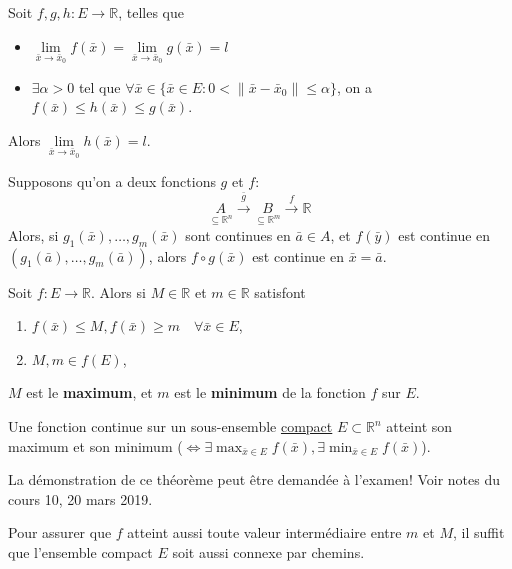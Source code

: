 \documentclass{report}
\newcommand*{\norm}[1]{\lVert#1\rVert}
\begin{document}
\begin{thm}
	Soit $f, g, h : E \to \mathbb R$, telles que
	\begin{itemize}
		\item $\lim\limits_{\bar x \to \bar x_0} f(\bar x) = \lim\limits_{\bar x \to \bar x_0} g(\bar x) = l$
		\item $\exists \alpha > 0$ tel que $\forall \bar x \in \{\bar x \in E : 0 < \norm{\bar x - \bar x_0} \leq \alpha\}$, on a $f(\bar x) \leq h(\bar x) \leq g(\bar x)$.
	\end{itemize}
	Alors $\lim\limits_{\bar x \to \bar x_0} h(\bar x) = l$.
\end{thm}

\begin{thm} Supposons qu'on a deux fonctions $g$ et $f$:
	\begin{equation*}
		\underset{\subseteq \mathbb R^n}{A} \overset{\bar g}{\longrightarrow} \underset{\subseteq \mathbb R^m}{B} \overset{f}{\longrightarrow} \mathbb R
	\end{equation*}
	Alors, si $g_1(\bar x), \ldots, g_m(\bar x)$ sont continues en $\bar a \in A$, et $f(\bar y)$ est continue en $(g_1(\bar a), \ldots, g_m(\bar a))$, alors $f \circ g(\bar x)$ est continue en $\bar x = \bar a$.
\end{thm}

\begin{defn}
	Soit $f : E \to \mathbb R$. Alors si $M \in \mathbb R$ et $m \in \mathbb R$ satisfont
	\begin{enumerate}
		\item $f(\bar x) \leq M, f(\bar x) \geq m \quad \forall \bar x \in E$,
		\item $M, m \in f(E)$,
	\end{enumerate}
	$M$ est le \textbf{maximum}, et $m$ est le \textbf{minimum} de la fonction $f$ sur $E$.
\end{defn}

\begin{thm}
	Une fonction continue sur un sous-ensemble \underline{compact} $E \subset \mathbb R^n$ atteint son maximum et son minimum ($\iff \exists \max_{\bar x \in E} f(\bar x), \exists \min_{\bar x \in E} f(\bar x)$).
\end{thm}
\begin{attention}
	La démonstration de ce théorème peut être demandée à l'examen! Voir notes du cours 10, 20 mars 2019.
\end{attention}

\begin{remark}
	Pour assurer que $f$ atteint aussi toute valeur intermédiaire entre $m$ et $M$, il suffit que l'ensemble compact $E$ soit aussi connexe par chemins.
\end{remark}
\end{document}

